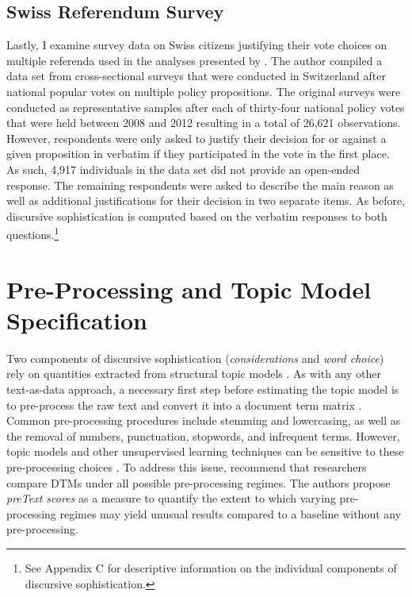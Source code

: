 \documentclass[12pt]{article}
\begin{document}
\subsection*{Swiss Referendum Survey}
Lastly, I examine survey data on Swiss citizens justifying their vote choices on multiple referenda used in the analyses presented by \citet{colombo2016justifications}. The author compiled a data set from cross-sectional surveys that were conducted in Switzerland after national popular votes on multiple policy propositions. The original surveys were conducted as representative samples after each of thirty-four national policy votes that were held between 2008 and 2012 resulting in a total of 26,621 observations. However, respondents were only asked to justify their decision for or against a given proposition in verbatim if they participated in the vote in the first place. As such, 4,917 individuals in the data set did not provide an open-ended response. The remaining respondents were asked to describe the main reason as well as additional justifications for their decision in two separate items. As before, discursive sophistication is computed based on the verbatim responses to both questions.\footnote{See Appendix C for descriptive information on the individual components of discursive sophistication.}


\section*{Pre-Processing and Topic Model Specification}

Two components of discursive sophistication (\textit{considerations} and \textit{word choice}) rely on quantities extracted from structural topic models \citep{roberts2014structural}. As with any other text-as-data approach, a necessary first step before estimating the topic model is to pre-process the raw text and convert it into a document term matrix \citep[DTM, see for example][]{manning2008introduction}. Common pre-processing procedures include stemming and lowercasing, as well as the removal of numbers, punctuation, stopwords, and infrequent terms. However, topic models and other unsupervised learning techniques can be sensitive to these pre-processing choices \citep[c.f.,][]{denny2018text}. To address this issue, \citet{denny2018text} recommend that researchers compare DTMs under all possible pre-processing regimes. The authors propose \textit{preText scores} as a measure to quantify the extent to which varying pre-processing regimes may yield unusual results compared to a baseline without any pre-processing.
\end{document}
